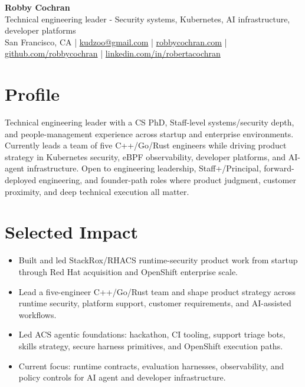 \documentclass[9pt,letterpaper]{extarticle}
\newcommand{\link}[2]{\href{#1}{#2}}
\begin{document}
{\LARGE \textbf{Robby Cochran}}\\[-1pt]
{\small Technical engineering leader - Security systems, Kubernetes, AI infrastructure, developer platforms}\\[-1pt]
{\small San Francisco, CA \;|\; \link{mailto:kudzoo@gmail.com}{kudzoo@gmail.com} \;|\; \link{https://www.robbycochran.com}{robbycochran.com} \;|\; \link{https://github.com/robbycochran}{github.com/robbycochran} \;|\; \link{https://www.linkedin.com/in/robertacochran}{linkedin.com/in/robertacochran}}

\section*{Profile}
Technical engineering leader with a CS PhD, Staff-level systems/security depth, and people-management experience across startup and enterprise environments. Currently leads a team of five C++/Go/Rust engineers while driving product strategy in Kubernetes security, eBPF observability, developer platforms, and AI-agent infrastructure. Open to engineering leadership, Staff+/Principal, forward-deployed engineering, and founder-path roles where product judgment, customer proximity, and deep technical execution all matter.

\section*{Selected Impact}
\begin{itemize}
  \item Built and led StackRox/RHACS runtime-security product work from startup through Red Hat acquisition and OpenShift enterprise scale.
  \item Lead a five-engineer C++/Go/Rust team and shape product strategy across runtime security, platform support, customer requirements, and AI-assisted workflows.
  \item Led ACS agentic foundations: hackathon, CI tooling, support triage bots, skills strategy, secure harness primitives, and OpenShift execution paths.
  \item Current focus: runtime contracts, evaluation harnesses, observability, and policy controls for AI agent and developer infrastructure.
\end{itemize}
\end{document}
